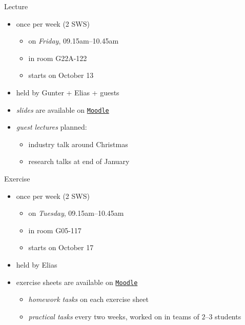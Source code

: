\begin{frame}{\myframetitle}
	\begin{fancycolumns}
		\begin{definition}{Lecture}
			\begin{itemize}
				\item once per week (2 SWS)
				\begin{itemize}
					\item on \emph{Friday}, 09.15am--10.45am
					\item in room G22A-122
					\item starts on October 13
				\end{itemize}
				\item held by Gunter + Elias + guests
				\item \emph{slides} are available on \texttt{\href{https://elearning.ovgu.de/course/view.php?id=15521}{Moodle}}
				\item \emph{guest lectures} planned:
				\begin{itemize}
					\item industry talk around Christmas
					\item research talks at end of January
				\end{itemize}
			\end{itemize}
		\end{definition}
	\nextcolumn
		\begin{example}{Exercise}
			\begin{itemize}
				\item once per week (2 SWS)
				\begin{itemize}
					\item on \emph{Tuesday}, 09.15am--10.45am
					\item in room G05-117
					\item starts on October 17
				\end{itemize}
				\item held by Elias
				\item exercise sheets are available on \texttt{\href{https://elearning.ovgu.de/course/view.php?id=15521}{Moodle}}
				\begin{itemize}
					\item \emph{homework tasks} on each exercise sheet
					\item \emph{practical tasks} every two weeks, worked on in teams of $2$--$3$ students
				\end{itemize}
			\end{itemize}
		\end{example}
	\end{fancycolumns}
\end{frame}


